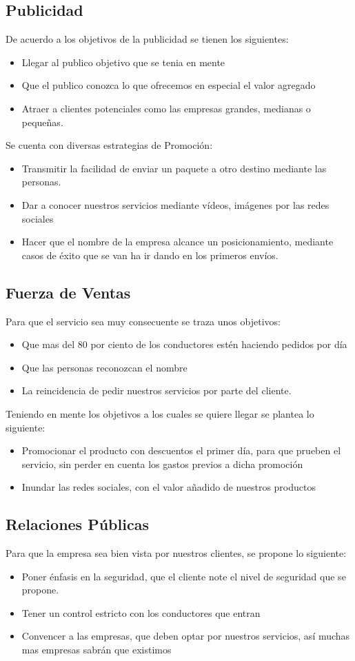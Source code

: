 \subsection{Publicidad}
De acuerdo a los objetivos de la publicidad se tienen los siguientes:
\begin{itemize}
\item Llegar al publico objetivo que se tenia en mente 
\item Que el publico conozca lo que ofrecemos en especial el valor agregado
\item Atraer a clientes potenciales como las empresas grandes, medianas o pequeñas.
\end{itemize}
Se cuenta con diversas estrategias de Promoción:
\begin{itemize}
\item Transmitir la facilidad de enviar un paquete a otro destino mediante las personas.
\item Dar a conocer nuestros servicios mediante vídeos, imágenes por las redes sociales
\item Hacer que el nombre de la empresa alcance un posicionamiento, mediante casos de éxito que se van ha ir dando en los primeros envíos.

\end{itemize}
\subsection{Fuerza de Ventas}
Para que el servicio sea muy consecuente se traza unos objetivos:
\begin{itemize}
\item Que mas del 80 por ciento de los conductores estén haciendo pedidos por día 
\item Que las personas reconozcan el nombre 
\item La reincidencia de pedir nuestros servicios por parte del cliente.
\end{itemize}
Teniendo en mente los objetivos a los cuales se quiere llegar se plantea lo siguiente:
\begin{itemize}
\item Promocionar el producto con descuentos el primer día, para que prueben el servicio, sin perder en cuenta los gastos previos a dicha promoción
\item Inundar las redes sociales, con el valor añadido de nuestros productos
\end{itemize}
\subsection{Relaciones Públicas}
Para que la empresa sea bien vista por nuestros clientes, se propone lo siguiente:
\begin{itemize}
\item Poner énfasis en la seguridad, que el cliente note el nivel de seguridad que se propone. 
\item Tener un control estricto con los conductores que entran 
\item Convencer a las empresas, que deben optar por nuestros servicios, así muchas mas empresas sabrán que existimos 
\end{itemize}
